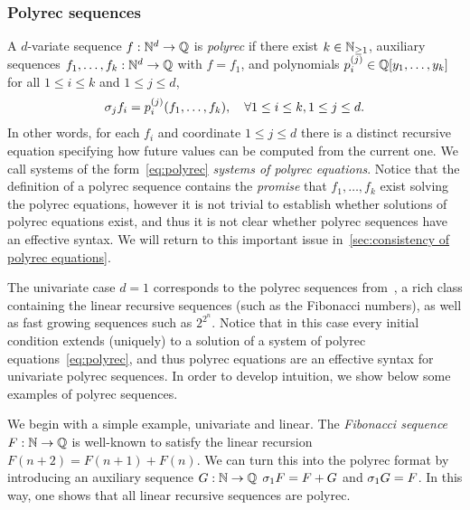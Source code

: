 \subsubsection{Polyrec sequences}
\label{sec:polyrec}

A $d$-variate sequence $f : \mathbb N^d \to \mathbb Q$ is \emph{polyrec}
if there exist $k \in \mathbb N_{\geq 1}$,
auxiliary sequences $f_1, \dots, f_k : \mathbb N^d \to \mathbb Q$ with $f = f_1$,
and polynomials $p^{(j)}_i \in \mathbb Q[y_1, \dots, y_k]$ for all $1 \leq i \leq k$ and $1 \leq j \leq d$, \st
%
\begin{align}
    \label{eq:polyrec}
    \sigma_{j} f_i
        = p^{(j)}_i(f_1, \dots, f_k),
        \quad \forall 1 \leq i \leq k, 1 \leq j \leq d.
\end{align}
%
%
In other words, for each $f_i$ and coordinate $1 \leq j \leq d$
there is a distinct recursive equation
specifying how future values can be computed from the current one.
%
We call systems of the form~\cref{eq:polyrec} \emph{systems of polyrec equations}.
%
Notice that the definition of a polyrec sequence contains the \emph{promise} that $f_1, \dots, f_k$ exist solving the polyrec equations,
however it is not trivial to establish whether solutions of polyrec equations exist,
and thus it is not clear whether polyrec sequences have an effective syntax.
%
We will return to this important issue in~\cref{sec:consistency of polyrec equations}.

The univariate case $d = 1$ corresponds to the polyrec sequences
from~\cite{Cadilhac:Mazowiecki:Paperman:Pilipczuk:Senizergues:ToCS:2021},
a rich class containing the linear recursive sequences (such as the Fibonacci numbers),
as well as fast growing sequences such as $2^{2^n}$.
%
Notice that in this case every initial condition extends (uniquely) to a solution of a system of polyrec equations~\cref{eq:polyrec},
and thus polyrec equations are an effective syntax for univariate polyrec sequences.
%
%
In order to develop intuition, we show below some examples of polyrec sequences.
%
\begin{example}
    We begin with a simple example, univariate and linear.
    The \emph{Fibonacci sequence} $F : \mathbb N \to \mathbb Q$
    is well-known to satisfy the linear recursion $F(n+2) = F(n+1) + F(n)$.
    We can turn this into the polyrec format by introducing an auxiliary sequence $G : \mathbb N \to \mathbb Q$ \st\-
    $\sigma_{1} F = F + G$ and $\sigma_{1} G = F$.
    In this way, one shows that all linear recursive sequences are polyrec.
\end{example}

